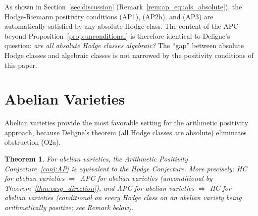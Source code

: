 \documentclass[aps,prd,twocolumn,superscriptaddress,nofootinbib]{revtex4-2}
\newtheorem{theorem}{Theorem}[section]
\theoremstyle{definition}
\theoremstyle{remark}
\begin{document}
As shown in Section~\ref{sec:discussion} (Remark~\ref{rem:ap_equals_absolute}), the Hodge-Riemann positivity conditions (AP1), (AP2b), and (AP3) are automatically satisfied by any absolute Hodge class. The content of the APC beyond Proposition~\ref{prop:unconditional} is therefore identical to Deligne's question: \textit{are all absolute Hodge classes algebraic?} The ``gap'' between absolute Hodge classes and algebraic classes is not narrowed by the positivity conditions of this paper.


\section{Abelian Varieties}
\label{sec:abelian}

Abelian varieties provide the most favorable setting for the arithmetic positivity approach, because Deligne's theorem (all Hodge classes are absolute) eliminates obstruction (O2a).

\begin{theorem}
\label{thm:abelian}
For abelian varieties, the Arithmetic Positivity Conjecture~\ref{conj:AP} is equivalent to the Hodge Conjecture. More precisely: HC for abelian varieties $\Rightarrow$ APC for abelian varieties (unconditional by Theorem~\ref{thm:easy_direction}), and APC for abelian varieties $\Rightarrow$ HC for abelian varieties (conditional on every Hodge class on an abelian variety being arithmetically positive; see Remark below).
\end{theorem}
\end{document}

